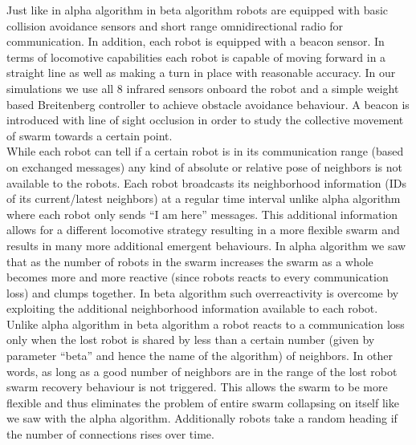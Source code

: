 \documentclass[a4paper, 10pt, conference]{ieeeconf}
\begin{document}
  Just like in alpha algorithm in beta algorithm robots are equipped with basic collision avoidance sensors and short range omnidirectional radio for communication. In addition, each robot is equipped with a beacon sensor. In terms of locomotive capabilities each robot is capable of moving forward in a straight line as well as making a turn in place with reasonable accuracy. In our simulations we use all 8 infrared sensors onboard the robot and a simple weight based Breitenberg controller to achieve obstacle avoidance behaviour. A beacon is introduced with line of sight occlusion in order to study the collective movement of swarm towards a certain point.\\

  While each robot can tell if a certain robot is in its communication range (based on exchanged messages) any kind of absolute or relative pose of neighbors is not available to the robots. Each robot broadcasts its neighborhood information (IDs of its current/latest neighbors) at a regular time interval unlike alpha algorithm where each robot only sends ``I am here'' messages. This additional information allows for a different locomotive strategy resulting in a more flexible swarm and results in many more additional emergent behaviours. In alpha algorithm we saw that as the number of robots in the swarm increases the swarm as a whole becomes more and more reactive (since robots reacts to every communication loss) and clumps together. In beta algorithm such overreactivity is overcome by exploiting the additional neighborhood information available to each robot. Unlike alpha algorithm in beta algorithm a robot reacts to a communication loss only when the lost robot is shared by less than a certain number (given by parameter ``beta'' and hence the name of the algorithm) of neighbors. In other words, as long as a good number of neighbors are in the range of the lost robot swarm recovery behaviour is not triggered. This allows the swarm to be more flexible and thus eliminates the problem of entire swarm collapsing on itself like we saw with the alpha algorithm. Additionally robots take a random heading if the number of connections rises over time.\\
\end{document}
